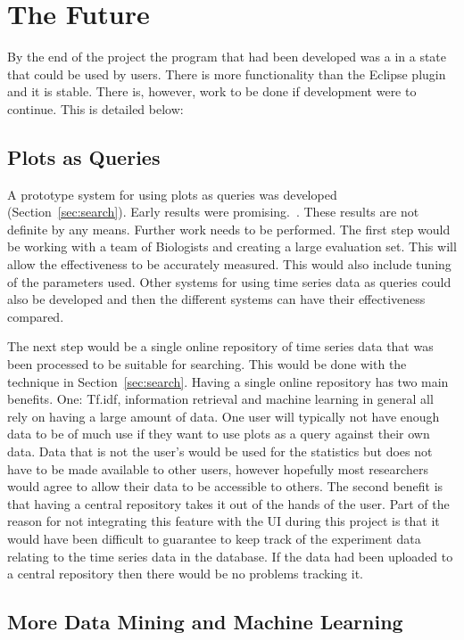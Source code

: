 \section{The Future}

By the end of the project the program that had been developed was a in a state that could be used by users.  There is more functionality than the Eclipse plugin and it is stable.  There is, however, work to be done if development were to continue.  This is detailed below:

\subsection{Plots as Queries}
A prototype system for using plots as queries was developed (Section~\ref{sec:search}).  Early results were promising.~.  These results are not definite by any means.  Further work needs to be performed.  The first step would be working with a team of Biologists and creating a large evaluation set.  This will allow the effectiveness to be accurately measured.  This would also include tuning of the parameters used.  Other systems for using time series data as queries could also be developed and then the different systems can have their effectiveness compared.

The next step would be a single online repository of time series data that was been processed to be suitable for searching.  This would be done with the technique in Section~\ref{sec:search}.  Having a single online repository has two main benefits.  One: Tf.idf, information retrieval and machine learning in general all rely on having a large amount of data.  One user will typically not have enough data to be of much use if they want to use plots as a query against their own data.  Data that is not the user's would be used for the statistics but does not have to be made available to other users, however hopefully most researchers would agree to allow their data to be accessible to others.  The second benefit is that having a central repository takes it out of the hands of the user.  Part of the reason for not integrating this feature with the \ac{UI} during this project is that it would have been difficult to guarantee to keep track of the experiment data relating to the time series data in the database.  If the data had been uploaded to a central repository then there would be no problems tracking it.

\subsection{More Data Mining and Machine Learning}


